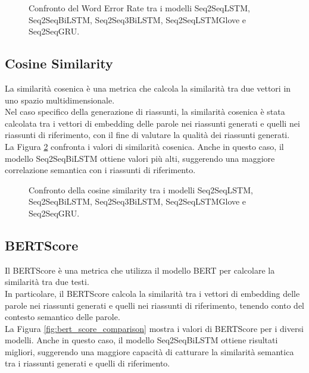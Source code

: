 \begin{figure}[H]
    \centering
    \hfill
    \hfill
    \hfill
    \hfill

    \caption{Confronto del Word Error Rate tra i modelli Seq2SeqLSTM, Seq2SeqBiLSTM, Seq2Seq3BiLSTM, Seq2SeqLSTMGlove e Seq2SeqGRU.}
    \label{fig:wer_comparison}
\end{figure}


\subsection{Cosine Similarity}
La similarit\`a cosenica \`e una metrica che calcola la similarit\`a tra due vettori in uno spazio multidimensionale.\\
Nel caso specifico della generazione di riassunti, la similarit\`a cosenica \`e stata calcolata tra i vettori di embedding delle parole nei riassunti generati e quelli nei riassunti di riferimento, con il fine di valutare la qualit\`a dei riassunti generati.\\
La Figura \ref{fig:cosine_similarity_comparison} confronta i valori di similarit\`a cosenica. Anche in questo caso, il modello Seq2SeqBiLSTM ottiene valori pi\`u alti, suggerendo una maggiore correlazione semantica con i riassunti di riferimento.

\begin{figure}[H]
    \centering
    \hfill
    \hfill
    \hfill
    \hfill

    \caption{Confronto della cosine similarity tra i modelli Seq2SeqLSTM, Seq2SeqBiLSTM, Seq2Seq3BiLSTM, Seq2SeqLSTMGlove e Seq2SeqGRU.}
    \label{fig:cosine_similarity_comparison}
\end{figure}

\subsection{BERTScore}
Il BERTScore \`e una metrica che utilizza il modello BERT per calcolare la similarit\`a tra due testi.\\
In particolare, il BERTScore calcola la similarit\`a tra i vettori di embedding delle parole nei riassunti generati e quelli nei riassunti di riferimento, tenendo conto del contesto semantico delle parole.\\
La Figura \ref{fig:bert_score_comparison} mostra i valori di BERTScore per i diversi modelli. Anche in questo caso, il modello Seq2SeqBiLSTM ottiene risultati migliori, suggerendo una maggiore capacit\`a di catturare la similarit\`a semantica tra i riassunti generati e quelli di riferimento.

